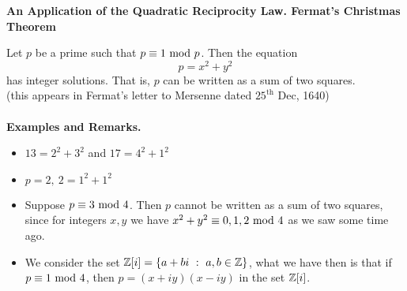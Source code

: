 \vspace*{5em}

{\bf An Application of the Quadratic Reciprocity Law. Fermat's Christmas Theorem}

\begin{theorem}\label{fermchr}
Let $p$ be a prime such that $p \equiv 1 \text{ mod }{p}$. Then the equation
\[p = x^2 + y^2\]
has integer solutions. That is, $p$ can be written as a sum of two squares.\\[0.5em]
(this appears in Fermat's letter to Mersenne dated $25^{\text{th}}$ Dec, 1640)\\
\\
{\bf Examples and Remarks.}
\begin{itemize}
\item $13 = 2^2 + 3^2$ and $17 = 4^2 + 1^2$
\item $p=2,\ 2 = 1^2 + 1^2$
\item Suppose $p \equiv 3\text{ mod }{4}$. Then $p$ cannot be written as a sum of two squares, since for integers $x,y$ we have $x^2 + y^2 \equiv 0,1,2 \text{ mod }{4}$ as we saw some time ago.
\item We consider the set $\mathbb Z[i] = \left\{a + bi\ :\ a,b \in \mathbb Z\right\}$, what we have then is that if $p \equiv 1 \text{ mod }{4}$, then $p = (x+iy)(x-iy)$ in the set $\mathbb Z[i]$.
\end{itemize}
\end{theorem}


